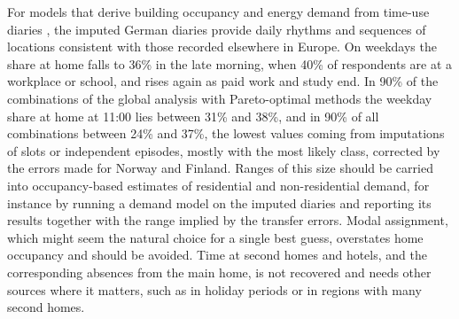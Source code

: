 \documentclass[a4paper]{article}
\begin{document}
For models that derive building occupancy and energy demand from time-use diaries \parencite{torritiReviewTimeUse2014,lopianoEnergyDemandIts2022}, the imputed German diaries provide daily rhythms and sequences of locations consistent with those recorded elsewhere in Europe. On weekdays the share at home falls to 36\% in the late morning, when 40\% of respondents are at a workplace or school, and rises again as paid work and study end. In 90\% of the combinations of the global analysis with Pareto-optimal methods the weekday share at home at 11:00 lies between 31\% and 38\%, and in 90\% of all combinations between 24\% and 37\%, the lowest values coming from imputations of slots or independent episodes, mostly with the most likely class, corrected by the errors made for Norway and Finland. Ranges of this size should be carried into occupancy-based estimates of residential and non-residential demand, for instance by running a demand model on the imputed diaries and reporting its results together with the range implied by the transfer errors. Modal assignment, which might seem the natural choice for a single best guess, overstates home occupancy and should be avoided. Time at second homes and hotels, and the corresponding absences from the main home, is not recovered and needs other sources where it matters, such as in holiday periods or in regions with many second homes.
\end{document}
